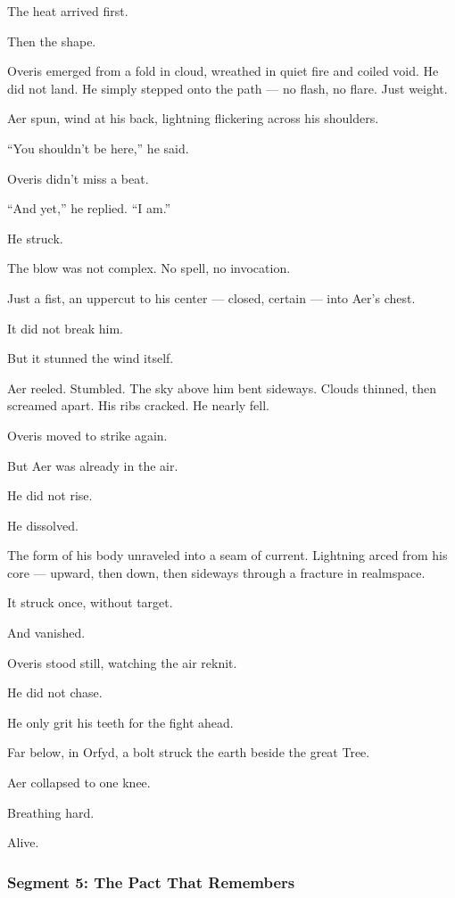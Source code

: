 \documentclass[9pt]{article}
\begin{document}
The heat arrived first.

Then the shape.

Overis emerged from a fold in cloud, wreathed in quiet fire and coiled void. He did not land. He simply stepped onto the path — no flash, no flare. Just weight.

Aer spun, wind at his back, lightning flickering across his shoulders.

``You shouldn’t be here,'' he said.

Overis didn't miss a beat.

``And yet,'' he replied. ``I am.''

He struck.

The blow was not complex. No spell, no invocation.

Just a fist, an uppercut to his center — closed, certain — into Aer’s chest.

It did not break him.

But it stunned the wind itself.

Aer reeled. Stumbled. The sky above him bent sideways. Clouds thinned, then screamed apart. His ribs cracked. He nearly fell.

Overis moved to strike again.

But Aer was already in the air.

He did not rise.

He dissolved.

The form of his body unraveled into a seam of current. Lightning arced from his core — upward, then down, then sideways through a fracture in realmspace.

It struck once, without target.

And vanished.

Overis stood still, watching the air reknit.

He did not chase.

He only grit his teeth for the fight ahead.

Far below, in Orfyd, a bolt struck the earth beside the great Tree.

Aer collapsed to one knee.

Breathing hard.

Alive.


\newpage

\subsubsection*{Segment 5: The Pact That Remembers}
\end{document}
